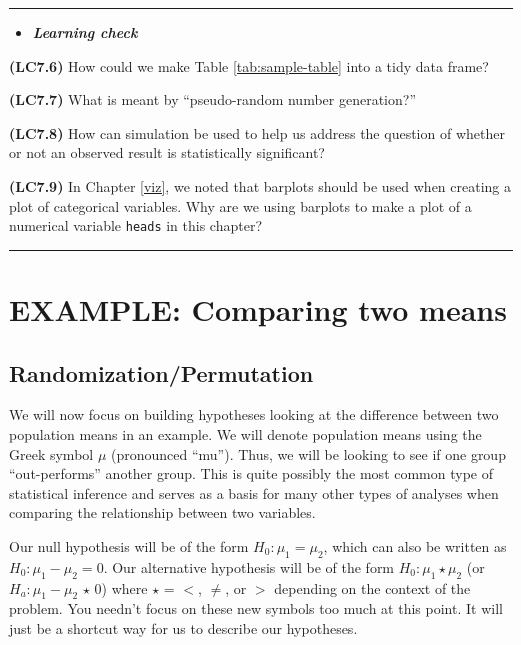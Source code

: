 \documentclass[]{tufte-book}
\let\oldrule=\rule
\renewcommand{\rule}[1]{\oldrule{\linewidth}}
\newenvironment{rmdblock}[1]
  {\begin{shaded*}
  \begin{itemize}
  \renewcommand{\labelitemi}{
    \raisebox{-.7\height}[0pt][0pt]{
    }
  }
  \item
  }
  {
  \end{itemize}
  \end{shaded*}
  }
\newenvironment{learncheck}
  {\begin{rmdblock}{warning}}
  {\end{rmdblock}}
\begin{document}
\begin{center}\rule{0.5\linewidth}{\linethickness}\end{center}

\begin{learncheck}
\textbf{\emph{Learning check}}
\end{learncheck}

\textbf{(LC7.6)} How could we make Table \ref{tab:sample-table} into a
tidy data frame?

\textbf{(LC7.7)} What is meant by ``pseudo-random number generation?''

\textbf{(LC7.8)} How can simulation be used to help us address the
question of whether or not an observed result is statistically
significant?

\textbf{(LC7.9)} In Chapter \ref{viz}, we noted that barplots should be
used when creating a plot of categorical variables. Why are we using
barplots to make a plot of a numerical variable \texttt{heads} in this
chapter?

\begin{center}\rule{0.5\linewidth}{\linethickness}\end{center}

\section{EXAMPLE: Comparing two
means}\label{example-comparing-two-means}

\subsection{Randomization/Permutation}\label{randomizationpermutation}

We will now focus on building hypotheses looking at the difference
between two population means in an example. We will denote population
means using the Greek symbol \(\mu\) (pronounced ``mu''). Thus, we will
be looking to see if one group ``out-performs'' another group. This is
quite possibly the most common type of statistical inference and serves
as a basis for many other types of analyses when comparing the
relationship between two variables.

Our null hypothesis will be of the form \(H_0: \mu_1 = \mu_2\), which
can also be written as \(H_0: \mu_1 - \mu_2 = 0\). Our alternative
hypothesis will be of the form \(H_0: \mu_1 \star \mu_2\) (or
\(H_a: \mu_1 - \mu_2 \, \star \, 0\)) where \(\star\) = \(<\), \(\ne\),
or \(>\) depending on the context of the problem. You needn't focus on
these new symbols too much at this point. It will just be a shortcut way
for us to describe our hypotheses.
\end{document}

